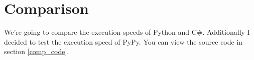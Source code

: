 \section{Comparison}

We're going to compare the execution speeds of Python and C\#. Additionally I decided to test the execution speed of PyPy. You can view the source code in section \ref{comp_code}.







